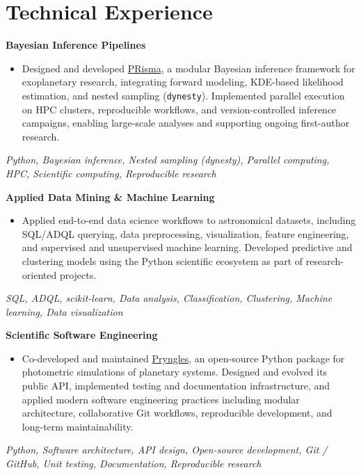 \section*{Technical Experience}

\textbf{Bayesian Inference Pipelines}
\begin{itemize}
    \item Designed and developed \href{https://github.com/seap-udea/PRisma}{PRisma}, a modular Bayesian inference framework for exoplanetary research, integrating forward modeling, KDE-based likelihood estimation, and nested sampling (\texttt{dynesty}). Implemented parallel execution on HPC clusters, reproducible workflows, and version-controlled inference campaigns, enabling large-scale analyses and supporting ongoing first-author research.
\end{itemize}
\textit{Python, Bayesian inference, Nested sampling (dynesty), Parallel computing, HPC, Scientific computing, Reproducible research}

\vspace{6pt}
\textbf{Applied Data Mining \& Machine Learning}
\begin{itemize}
    \item Applied end-to-end data science workflows to astronomical datasets, including SQL/ADQL querying, data preprocessing, visualization, feature engineering, and supervised and unsupervised machine learning. Developed predictive and clustering models using the Python scientific ecosystem as part of research-oriented projects.
\end{itemize}
\textit{SQL, ADQL, scikit-learn, Data analysis, Classification, Clustering, Machine learning, Data visualization}

\vspace{6pt}
\textbf{Scientific Software Engineering}
\begin{itemize}
    \item Co-developed and maintained \href{https://github.com/seap-udea/pryngles}{Pryngles}, an open-source Python package for photometric simulations of planetary systems. Designed and evolved its public API, implemented testing and documentation infrastructure, and applied modern software engineering practices including modular architecture, collaborative Git workflows, reproducible development, and long-term maintainability.
\end{itemize}
\textit{Python, Software architecture, API design, Open-source development, Git / GitHub, Unit testing, Documentation, Reproducible research}
